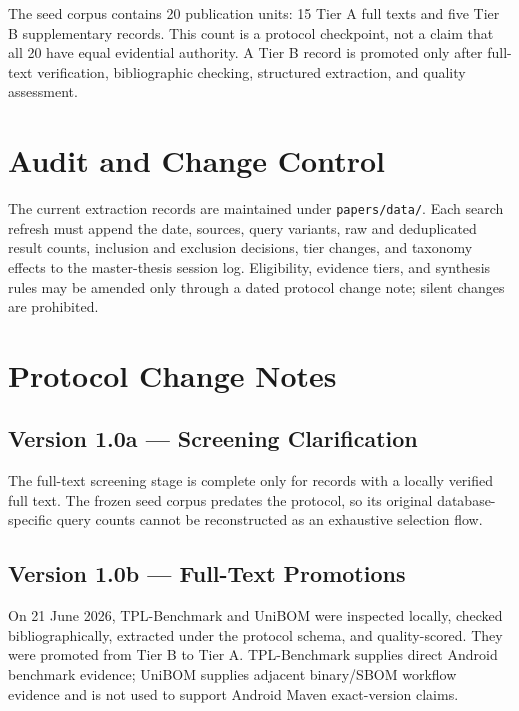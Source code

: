 The seed corpus contains 20 publication units: 15 Tier A full texts and five
Tier B supplementary records. This count is a protocol checkpoint, not a claim
that all 20 have equal evidential authority. A Tier B record is promoted only
after full-text verification, bibliographic checking, structured extraction,
and quality assessment.

\section{Audit and Change Control}

The current extraction records are maintained under
\texttt{papers/data/}. Each search refresh must append the date, sources,
query variants, raw and deduplicated result counts, inclusion and exclusion
decisions, tier changes, and taxonomy effects to the master-thesis session log.
Eligibility, evidence tiers, and synthesis rules may be amended only through a
dated protocol change note; silent changes are prohibited.

\section{Protocol Change Notes}

\subsection{Version 1.0a --- Screening Clarification}

The full-text screening stage is complete only for records with a locally
verified full text. The frozen seed corpus predates the protocol, so its
original database-specific query counts cannot be reconstructed as an
exhaustive selection flow.

\subsection{Version 1.0b --- Full-Text Promotions}

On 21 June 2026, TPL-Benchmark and UniBOM were inspected locally, checked
bibliographically, extracted under the protocol schema, and quality-scored.
They were promoted from Tier B to Tier A. TPL-Benchmark supplies direct
Android benchmark evidence; UniBOM supplies adjacent binary/SBOM workflow
evidence and is not used to support Android Maven exact-version claims.
